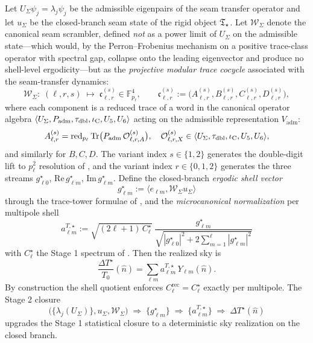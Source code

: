 \begin{conjecture}
\label{thm:cmb_seam_phase_realization}
Let $U_\Sigma\psi_j=\lambda_j\psi_j$ be the admissible eigenpairs of the seam transfer operator
and let $u_\Sigma$ be the closed-branch seam state of the rigid object $\mathfrak T_{\star}$.  Let
$\mathcal W_\Sigma$ denote the canonical seam scrambler, defined \emph{not} as a power limit of
$U_\Sigma$ on the admissible state---which would, by the Perron--Frobenius mechanism on a positive
trace-class operator with spectral gap, collapse onto the leading eigenvector and produce no
shell-level ergodicity---but as the
\emph{projective modular trace cocycle} associated with the seam-transfer dynamics:
\[
\mathcal W_\Sigma:\;
(\ell,r,s)\;\longmapsto\;\mathfrak c_{\ell,r}^{(s)}\in\mathbb F_{p_\ell}^4,
\qquad
\mathfrak c_{\ell,r}^{(s)}
:=
\bigl(A_{\ell,r}^{(s)},B_{\ell,r}^{(s)},C_{\ell,r}^{(s)},D_{\ell,r}^{(s)}\bigr),
\]
where each component is a reduced trace of a word in the canonical operator algebra
\(
\langle U_\Sigma,P_{\mathrm{adm}},\tau_{\mathrm{dbl}},\iota_{\mathrm C},U_5,U_6\rangle
\)
acting on the admissible representation $V_{\mathrm{adm}}$:
\[
A_{\ell,r}^{(s)}=
\operatorname{red}_{p_\ell}
\operatorname{Tr}\bigl(P_{\mathrm{adm}}\,\mathcal O_{\ell,r,A}^{(s)}\bigr),
\quad
\mathcal O_{\ell,r,X}^{(s)}\in\langle U_\Sigma,\tau_{\mathrm{dbl}},\iota_{\mathrm C},U_5,U_6\rangle,
\]
and similarly for $B,C,D$. The variant index $s\in\{1,2\}$ generates the
double-digit lift to $p_\ell^2$ resolution of , and the variant
index $r\in\{0,1,2\}$ generates the three streams $g_{\ell 0}^\star$,
$\mathrm{Re}\,g_{\ell m}^\star$, $\mathrm{Im}\,g_{\ell m}^\star$. Define the closed-branch
\emph{ergodic shell vector}
\[
g_{\ell m}^{\star}
:=
\langle e_{\ell m},\mathcal W_\Sigma u_\Sigma\rangle
\]
through the trace-tower formulae of , and the
\emph{microcanonical normalization} per multipole shell
\[
\boxed{\;
a_{\ell m}^{T,\star}
:=
\sqrt{(2\ell+1)\,C_\ell^\star}\;
\frac{g_{\ell m}^{\star}}{\sqrt{|g_{\ell 0}^{\star}|^2
+2\sum_{m=1}^{\ell}|g_{\ell m}^{\star}|^2}}\;}
\]
with $C_\ell^\star$ the Stage 1 spectrum of
.  Then the realized sky is
\[
\frac{\Delta T^\star}{T_0}(\hat n)
=
\sum_{\ell m}a_{\ell m}^{T,\star}\,Y_{\ell m}(\hat n).
\]
By construction the shell quotient enforces
$C_\ell^{\mathrm{rec}}=C_\ell^\star$ exactly per multipole. The Stage 2 closure
\[
\bigl(\{\lambda_j(U_\Sigma)\},u_\Sigma,\mathcal W_\Sigma\bigr)
\;\Longrightarrow\;
\{g_{\ell m}^{\star}\}
\;\Longrightarrow\;
\{a_{\ell m}^{T,\star}\}
\;\Longrightarrow\;
\Delta T^\star(\hat n)
\]
upgrades the Stage 1 statistical closure to a deterministic sky realization on the closed branch.
\end{conjecture}

